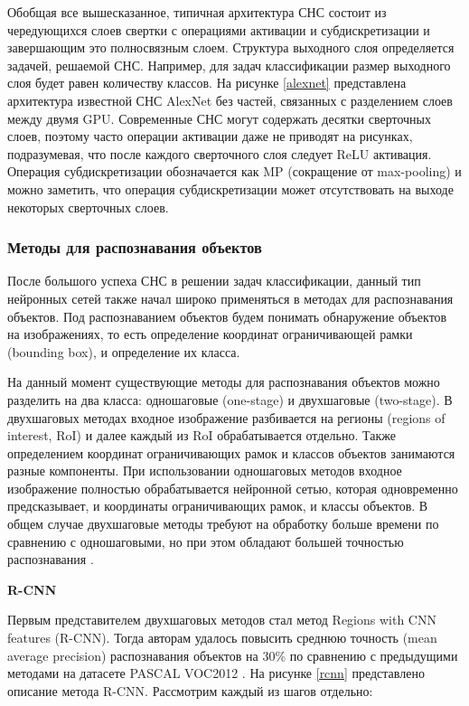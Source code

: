 Обобщая все вышесказанное, типичная архитектура СНС состоит из чередующихся слоев свертки с операциями активации и 
субдискретизации и завершающим это полносвязным слоем. Структура выходного слоя определяется задачей, решаемой СНС. 
Например, для задач классификации размер выходного слоя будет равен количеству классов. На рисунке \ref{alexnet}
представлена архитектура известной СНС AlexNet без частей, связанных с разделением слоев между двумя GPU. Современные
СНС могут содержать десятки сверточных слоев, поэтому часто операции активации даже не приводят на рисунках, подразумевая,
что после каждого сверточного слоя следует ReLU активация. Операция субдискретизации обозначается как MP (сокращение от 
max-pooling) и можно заметить, что операция субдискретизации может отсутствовать на выходе некоторых сверточных слоев.


\subsubsection{Методы для распознавания объектов}

После большого успеха СНС в решении задач классификации, данный тип нейронных сетей также начал широко применяться 
в методах для распознавания объектов. Под распознаванием объектов будем понимать обнаружение объектов на изображениях, 
то есть определение координат ограничивающей рамки (bounding box), и определение их класса. 

На данный момент существующие методы для распознавания объектов можно разделить на два класса: одношаговые (one-stage) 
и двухшаговые (two-stage). В двухшаговых методах входное изображение разбивается на регионы (regions of interest, RoI) 
и далее каждый из RoI обрабатывается отдельно. Также определением координат ограничивающих рамок и классов объектов 
занимаются разные компоненты. При использовании одношаговых методов входное изображение полностью обрабатывается нейронной 
сетью, которая одновременно предсказывает, и координаты ограничивающих рамок, и классы объектов. В общем случае 
двухшаговые методы требуют на обработку больше времени по сравнению с одношаговыми, но при этом обладают 
большей точностью распознавания \cite{DL_IN_OBJECT_DETECTION}.

\textbf{R-CNN}

Первым представителем двухшаговых методов стал метод Regions with CNN features (R-CNN). Тогда авторам удалось повысить 
среднюю точность (mean average precision) распознавания объектов на 30\% по сравнению с предыдущими методами на датасете 
PASCAL VOC2012 \cite{RCNN}. На рисунке \ref{rcnn} представлено описание метода R-CNN. Рассмотрим каждый из шагов отдельно:

